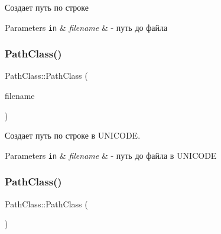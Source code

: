 Создает путь по строке 


\begin{DoxyParams}[1]{Parameters}
\mbox{\tt in}  & {\em filename} & -\/ путь до файла \\
\hline
\end{DoxyParams}
\mbox{\label{class_path_class_a46518182c742d1fa71a574bbf13654c4}} 
\subsubsection{\texorpdfstring{Path\+Class()}{PathClass()}\hspace{0.1cm}{\footnotesize\ttfamily [3/4]}}
{\footnotesize\ttfamily Path\+Class\+::\+Path\+Class (\begin{DoxyParamCaption}\item[{const std\+::wstring \&}]{filename }\end{DoxyParamCaption})}



Создает путь по строке в U\+N\+I\+C\+O\+DE. 


\begin{DoxyParams}[1]{Parameters}
\mbox{\tt in}  & {\em filename} & -\/ путь до файла в U\+N\+I\+C\+O\+DE \\
\hline
\end{DoxyParams}
\mbox{\label{class_path_class_ad5bad062639725c865cd5c1826a4da3e}} 
\subsubsection{\texorpdfstring{Path\+Class()}{PathClass()}\hspace{0.1cm}{\footnotesize\ttfamily [4/4]}}
{\footnotesize\ttfamily Path\+Class\+::\+Path\+Class (\begin{DoxyParamCaption}\item[{const \hyperlink{class_path_class}{Path\+Class} \&}]{ }\end{DoxyParamCaption})}

\mbox{\label{class_path_class_a7eea4d10f8252ba6963e8fd770e53e29}} 
